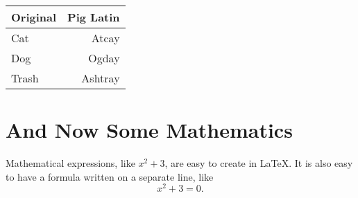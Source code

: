 \vspace{1.0in}		%

\begin{tabular}{|l|r|}	%
                                            
\hline	%
                                            
\textbf{Original} & \textbf{Pig Latin} \\		%
\hline
\hline
Cat & Atcay \\
Dog & Ogday \\
Trash & Ashtray \\
\hline
\end{tabular}		%

\section{And Now Some Mathematics}

Mathematical expressions, like $x^{2} + 3$, are easy to create in \LaTeX.
It is also easy to have a formula written on a separate line, like
\[x^{2} + 3 = 0.\]


